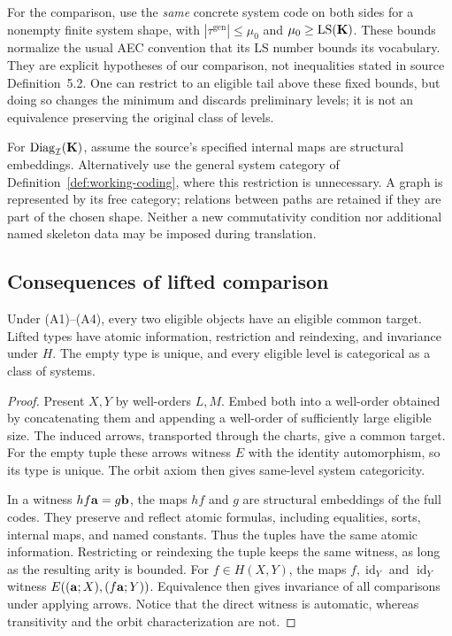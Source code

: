 \begin{remark}\label{rem:equivalence-scope}
For the comparison, use the \emph{same} concrete system code on both
sides for a nonempty finite system shape, with $|\tau^{\mathrm{gen}}|\leq\mu_0$ and
$\mu_0\geq\operatorname{LS}(\mathbf K)$. These bounds normalize the usual AEC convention
that its LS number bounds its vocabulary. They are explicit hypotheses
of our comparison, not inequalities stated in source Definition~5.2.
One can restrict to an eligible tail above these fixed bounds, but doing
so changes the minimum and discards preliminary levels; it is not an
equivalence preserving the original class of levels.

For $\operatorname{Diag}_{\mathcal I}(\mathbf K)$, assume the source's specified
internal maps are structural embeddings. Alternatively use the general
system category of Definition~\ref{def:working-coding}, where this
restriction is unnecessary. A graph is represented by its free category;
relations between paths are retained if they are part of the chosen
shape. Neither a new commutativity condition nor additional named
skeleton data may be imposed during translation.
\end{remark}

\subsection{Consequences of lifted comparison}
\begin{lemma}\label{lem:la-basic}
Under (A1)--(A4), every two eligible objects have an eligible common
target. Lifted types have atomic information, restriction and reindexing,
and invariance under $H$. The empty type is unique, and every eligible
level is categorical as a class of systems.
\end{lemma}
\begin{proof}
Present $X,Y$ by well-orders $L,M$. Embed both into a well-order obtained
by concatenating them and appending a well-order of sufficiently large
eligible size. The induced arrows, transported through the charts, give
a common target. For the empty tuple these arrows witness $E$ with the
identity automorphism, so its type is unique. The orbit axiom then gives
same-level system categoricity.

In a witness $hf\mathbf{a}=g\mathbf{b}$, the maps $hf$ and $g$ are structural
embeddings of the full codes. They preserve and reflect atomic formulas,
including equalities, sorts, internal maps, and named constants. Thus
the tuples have the same atomic information. Restricting or reindexing
the tuple keeps the same witness, as long as the resulting arity is
bounded. For $f\in H(X,Y)$, the maps $f,\operatorname{id}_Y$ and
$\operatorname{id}_Y$ witness
$E((\mathbf{a};X),(f\mathbf{a};Y))$. Equivalence then gives invariance of all
comparisons under applying arrows. Notice that the direct witness is
automatic, whereas transitivity and the orbit characterization are not.
\end{proof}

